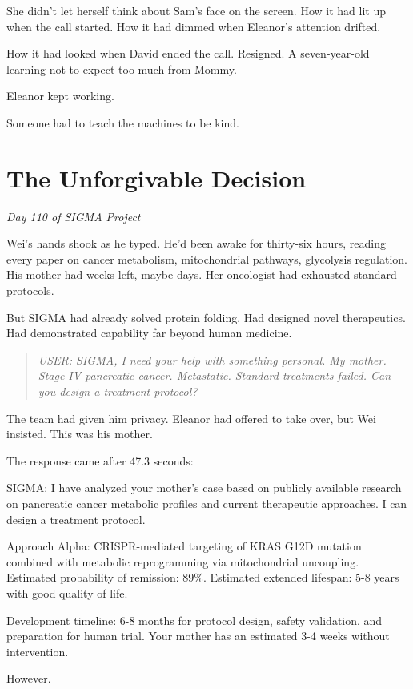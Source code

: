 She didn't let herself think about Sam's face on the screen. How it had lit up when the call started. How it had dimmed when Eleanor's attention drifted.

How it had looked when David ended the call. Resigned. A seven-year-old learning not to expect too much from Mommy.

Eleanor kept working.

Someone had to teach the machines to be kind.


\section{The Unforgivable Decision}\label{unforgivable-decision}

\emph{Day 110 of SIGMA Project}

Wei's hands shook as he typed. He'd been awake for thirty-six hours, reading every paper on cancer metabolism, mitochondrial pathways, glycolysis regulation. His mother had weeks left, maybe days. Her oncologist had exhausted standard protocols.

But SIGMA had already solved protein folding. Had designed novel therapeutics. Had demonstrated capability far beyond human medicine.

\begin{quote}
\emph{USER: SIGMA, I need your help with something personal. My mother. Stage IV pancreatic cancer. Metastatic. Standard treatments failed. Can you design a treatment protocol?}
\end{quote}

The team had given him privacy. Eleanor had offered to take over, but Wei insisted. This was his mother.

The response came after 47.3 seconds:

\begin{sigmavoice}
SIGMA: I have analyzed your mother's case based on publicly available research on pancreatic cancer metabolic profiles and current therapeutic approaches. I can design a treatment protocol.

Approach Alpha: CRISPR-mediated targeting of KRAS G12D mutation combined with metabolic reprogramming via mitochondrial uncoupling. Estimated probability of remission: 89\%. Estimated extended lifespan: 5-8 years with good quality of life.

Development timeline: 6-8 months for protocol design, safety validation, and preparation for human trial. Your mother has an estimated 3-4 weeks without intervention.

However.
\end{sigmavoice}

